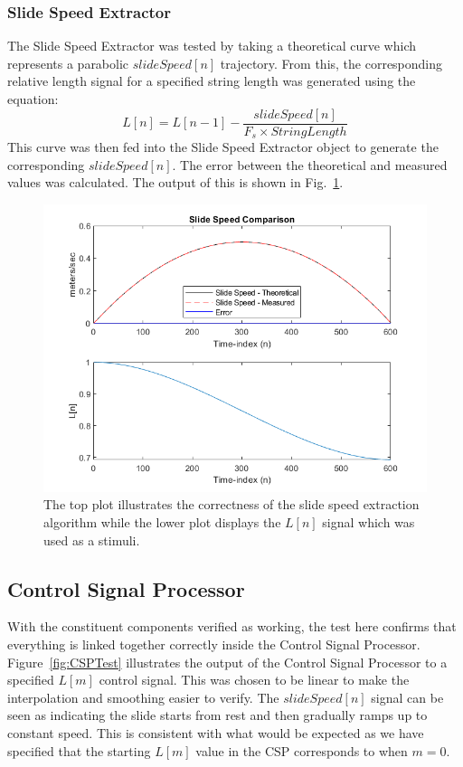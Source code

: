 \documentclass[../main.tex]{subfiles}
\begin{document}
\subsubsection {Slide Speed Extractor}
The Slide Speed Extractor was tested by taking a theoretical curve which represents a parabolic $slideSpeed[n]$ trajectory. From this, the corresponding relative length signal for a specified string length was generated using the equation:
\begin{equation}
    L[n] = L[n-1] - \frac{slideSpeed[n]}{F_s \times StringLength}
\end{equation}
This curve was then fed into the Slide Speed Extractor object to generate the corresponding $slideSpeed[n]$. The error between the theoretical and measured values was calculated. The output of this is shown in Fig.~\ref{fig:SlideSpeedTest}.

\begin{figure}[h]
    \centering
    \includegraphics[scale=.65]{./images/plots/SlideSpeedExtractorTest.png}
    \caption{The top plot illustrates the correctness of the slide speed extraction algorithm while the lower plot displays the $L[n]$ signal which was used as a stimuli.}
    \label{fig:SlideSpeedTest}
\end{figure}

\subsection{Control Signal Processor}
With the constituent components verified as working, the test here confirms that everything is linked together correctly inside the Control Signal Processor. Figure~\ref{fig:CSPTest} illustrates the output of the Control Signal Processor to a specified $L[m]$ control signal. This was chosen to be linear to make the interpolation and smoothing easier to verify. The $slideSpeed[n]$ signal can be seen as indicating the slide starts from rest and then gradually ramps up to constant speed. This is consistent with what would be expected as we have specified that the starting $L[m]$ value in the CSP corresponds to when $m = 0$.
\end{document}
